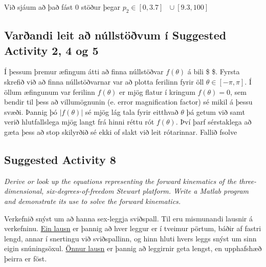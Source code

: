 \documentclass[11pt]{article}
\begin{document}
    Við sjáum að það fást 0 stöður þegar
\(p_2 \in [0, 3.7] \text{ } \cup [9.3, 100]\)

    \subsection{Varðandi leit að núllstöðvum í Suggested Activity 2, 4 og
5}\label{varuxf0andi-leit-auxf0-nuxfallstuxf6uxf0vum-uxed-suggested-activity-2-4-og-5}

Í þessum þremur æfingum átti að finna núllstöðvar \(f(\theta)\) á bili
\$ \theta \in[-\pi,\pi]\$. Fyrsta skrefið við að finna núllstöðvarnar
var að plotta ferilinn fyrir öll \(\theta \in [-\pi, \pi]\). Í öllum
æfingunum var ferilinn \(f(\theta)\) er mjög flatur í kringum
\(f(\theta) = 0\), sem bendir til þess að villumögnunin (e. error
magnification factor) sé mikil á þessu svæði. Þannig þó \(|f(\theta)|\)
sé mjög lág tala fyrir eitthvað \(\theta\) þá getum við samt verið
hlutfallslega mjög langt frá hinni réttu rót \(f(\theta)\). Því þarf
sérstaklega að gæta þess að stop skilyrðið sé ekki of slakt við leit
rótarinnar. Fallið fsolve

    \subsection{Suggested Activity 8}\label{suggested-activity-8}

\emph{Derive or look up the equations representing the forward
kinematics of the three-dimensional, six-degrees-of-freedom Stewart
platform. Write a Matlab program and demonstrate its use to solve the
forward kinematics.}

Verkefnið snýst um að hanna sex-leggja sviðspall. Til eru mismunandi
lausnir á verkefninu.
\href{https://www.youtube.com/watch?v=PIl8Epy9xIw\&t=34s}{Ein lausn} er
þannig að hver leggur er í tveimur pörtum, báðir af fastri lengd, annar
í snertingu við sviðspallinn, og hinn hluti hvers leggs snýst um sinn
eigin snúningsöxul.
\href{https://www.youtube.com/watch?v=PIl8Epy9xIw\&t=34s}{Önnur lausn}
er þannig að leggirnir geta lengst, en upphafshæð þeirra er föst.
\end{document}
